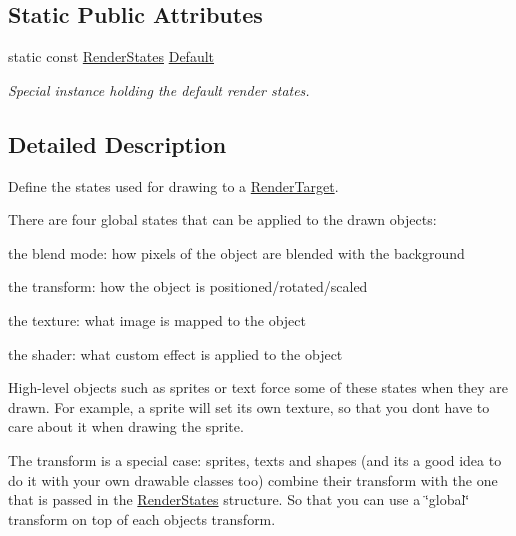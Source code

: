 \subsection*{Static Public Attributes}
\begin{DoxyCompactItemize}
\item 
\mbox{\label{classsf_1_1_render_states_ad29672df29f19ce50c3021d95f2bb062}} 
static const \mbox{\hyperlink{classsf_1_1_render_states}{Render\+States}} \mbox{\hyperlink{classsf_1_1_render_states_ad29672df29f19ce50c3021d95f2bb062}{Default}}
\begin{DoxyCompactList}\small\item\em Special instance holding the default render states. \end{DoxyCompactList}\end{DoxyCompactItemize}


\subsection{Detailed Description}
Define the states used for drawing to a \mbox{\hyperlink{classsf_1_1_render_target}{Render\+Target}}. 

\begin{DoxyVerb}\end{DoxyVerb}


There are four global states that can be applied to the drawn objects\+: \begin{DoxyItemize}
\item the blend mode\+: how pixels of the object are blended with the background \item the transform\+: how the object is positioned/rotated/scaled \item the texture\+: what image is mapped to the object \item the shader\+: what custom effect is applied to the object\end{DoxyItemize}
High-\/level objects such as sprites or text force some of these states when they are drawn. For example, a sprite will set its own texture, so that you don\textquotesingle{}t have to care about it when drawing the sprite.

The transform is a special case\+: sprites, texts and shapes (and it\textquotesingle{}s a good idea to do it with your own drawable classes too) combine their transform with the one that is passed in the \mbox{\hyperlink{classsf_1_1_render_states}{Render\+States}} structure. So that you can use a \char`\"{}global\char`\"{} transform on top of each object\textquotesingle{}s transform.

